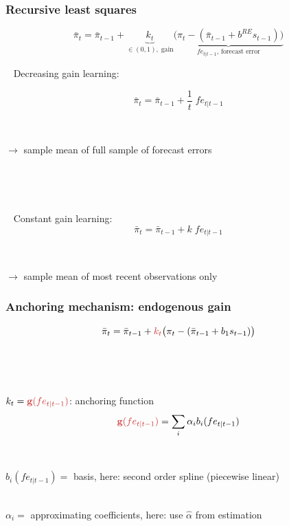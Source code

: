 \documentclass[10pt]{beamer}
\begin{document}
\begin{frame}
	\frametitle{Recursive least squares}
	\label{RLS_special}
	

\begin{equation}
\bar{\pi}_{t}  =\bar{\pi}_{t-1} + \underbrace{k_t}_{\in (0,1), \; \text{gain} } \underbrace{\big(\pi_{t} -(\bar{\pi}_{t-1}+b^{RE} s_{t-1}) \big)}_{fe_{t|t-1} \text{, forecast error} } 
\end{equation}
 
\
\pause
Decreasing gain learning:

\begin{equation}
\bar{\pi}_{t}  =\bar{\pi}_{t-1} +\frac{1}{t} \; fe_{t|t-1}
\end{equation}
 
 \
 
 $\rightarrow$ sample mean of full sample of forecast errors
 
\

\

\
\pause
Constant gain learning:
\begin{equation}
\bar{\pi}_{t}  =\bar{\pi}_{t-1} +k \; fe_{t|t-1}
\end{equation}

 \
 
 $\rightarrow$ sample mean of most recent observations only 



\end{frame}


\begin{frame}
	\frametitle{Anchoring mechanism: endogenous gain}
	\label{anchoring1}


\begin{equation}
\bar{\pi}_{t}  =\bar{\pi}_{t-1} + \textcolor{brownreddark}{k_t}\big(\pi_{t} -(\bar{\pi}_{t-1}+b_1 s_{t-1}) \big)
\end{equation}

\

\

$k_t = \textcolor{brownreddark}{\mathbf{g}(fe_{t|t-1})}$: anchoring function
\pause
\begin{equation}
 \textcolor{brownreddark}{\mathbf{g}(fe_{t|t-1})} = \sum_i\alpha_i b_i(fe_{t|t-1})\label{gain}
\end{equation}

\

$ b_i(fe_{t|t-1}) = $ basis, here: second order spline (piecewise linear) \\

\

$\alpha_i  = $ approximating coefficients, here: use $\hat{\alpha}$ from estimation

\vfill 

\hfill \hyperlink{estimate}{} \hyperlink{g}{}



\end{frame}
\end{document}

